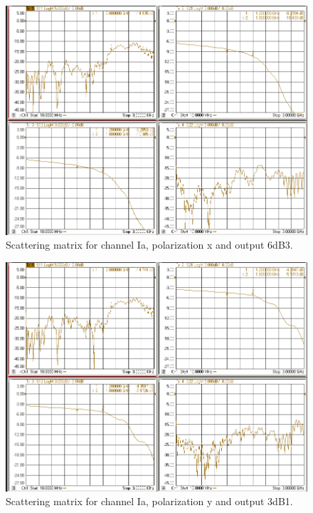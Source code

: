 \documentclass[12pt,a4paper,oneside]{article}
\begin{document}
\begin{figure}[H]
\centering
\includegraphics[width=0.9\linewidth]{VNA_results/Iax_6dB3.png}
\caption{Scattering matrix for channel Ia, polarization x and output 6dB3.}
\label{fig:Iax_6dB3}
\end{figure}


\begin{figure}[H]
\centering
\includegraphics[width=0.9\linewidth]{VNA_results/Iay_3dB1.png}
\caption{Scattering matrix for channel Ia, polarization y and output 3dB1.}
\label{fig:Iay_3dB1}
\end{figure}
\end{document}

